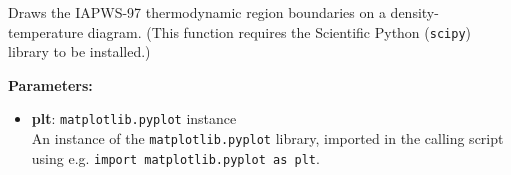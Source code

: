 Draws the IAPWS-97 thermodynamic region boundaries on a density-temperature diagram.  (This function requires the Scientific Python (\texttt{scipy}) library to be installed.)

\textbf{Parameters:}
\begin{itemize}
\item \textbf{plt}: \texttt{matplotlib.pyplot} instance\\
  An instance of the \texttt{matplotlib.pyplot} library, imported in the calling script using e.g. \texttt{import matplotlib.pyplot as plt}.
\end{itemize}
